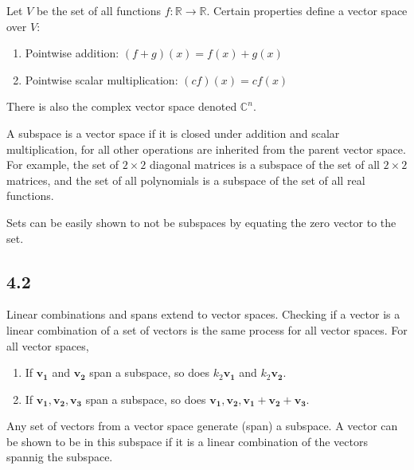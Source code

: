 \documentclass{article}
\begin{document}
    Let $V$ be the set of all functions $f: \mathbb{R} \rightarrow \mathbb{R}$. 
    Certain properties define a vector space over $V$:
    \begin{enumerate}
        \item Pointwise addition: $(f + g)(x) = f(x) + g(x)$
        \item Pointwise scalar multiplication: $(cf)(x) = cf(x)$
    \end{enumerate}
    There is also the complex vector space denoted $\mathbb{C}^n$.

    A subspace is a vector space if it is closed under addition and scalar multiplication, 
    for all other operations are inherited from the parent vector space. 
    For example, the set of $2 \times 2$ diagonal matrices is a subspace of the set of all $2 \times 2$ matrices,
    and the set of all polynomials is a subspace of the set of all real functions.

    Sets can be easily shown to not be subspaces by equating the zero vector to the set.

    \subsection*{4.2}
    Linear combinations and spans extend to vector spaces. 
    Checking if a vector is a linear combination of a set of vectors 
    is the same process for all vector spaces.
    For all vector spaces,
    \begin{enumerate}
        \item If $\mathbf{v_1}$ and $\mathbf{v_2}$ span a subspace, so does $k_2 \mathbf{v_1}$ and $k_2 \mathbf{v_2}$.
        \item If $\mathbf{v_1, v_2, v_3}$ span a subspace, so does $\mathbf{v_1, v_2, v_1 + v_2 + v_3}$.
    \end{enumerate}

    Any set of vectors from a vector space generate (span) a subspace.
    A vector can be shown to be in this subspace if it is a linear combination of the vectors spannig the subspace.
    
\end{document}
